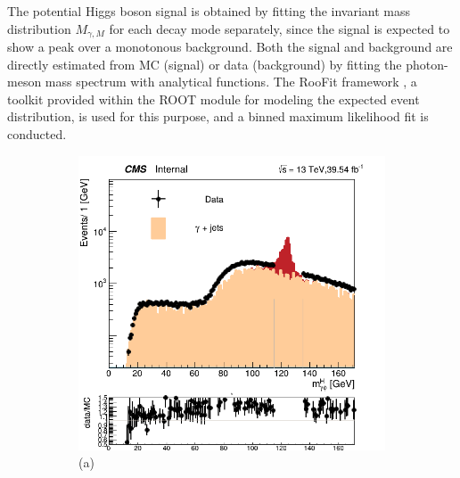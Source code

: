 The potential Higgs boson signal is obtained by fitting the invariant mass distribution $M_{\gamma, M}$ for each decay mode separately, since the signal is expected to show a peak over a monotonous background. Both the signal and background are directly estimated from MC (signal) or data (background) by fitting the photon-meson mass spectrum with analytical functions. The RooFit framework \cite{CERN:root_roofit}, a toolkit provided within the ROOT module for modeling the expected event distribution, is used for this purpose, and a binned maximum likelihood fit is conducted.
\begin{figure}[!ht]
    \captionsetup[subfigure]{labelformat=empty}
    \vspace*{-0.2cm}
    \centering
    \setlength{\mylength}{\textwidth}
    \begin{subfigure}[t]{0.50\mylength}
        \centering
        \includegraphics[width=0.45\mylength]{resources/plots/Phi3_HiggsMass.png}
        \caption{\footnotesize (a)}
    \end{subfigure}%
    \begin{subfigure}[t]{0.50\mylength}
        \centering

\end{subfigure}
\end{figure}
